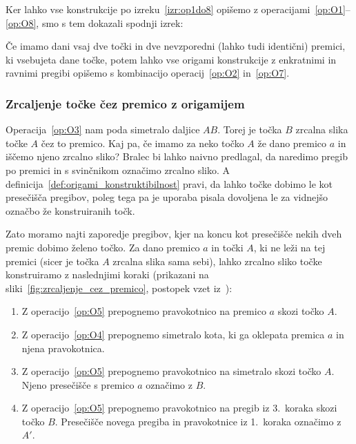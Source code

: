 Ker lahko vse konstrukcije po izreku~\ref{izr:op1do8} opišemo z operacijami~\ref{op:O1}--\ref{op:O8}, smo s tem dokazali spodnji izrek:

\begin{izrek}
    \label{izr:dve_operaciji}
    Če imamo dani vsaj dve točki in dve nevzporedni (lahko tudi identični) premici, ki vsebujeta dane točke, potem lahko vse origami konstrukcije z enkratnimi in ravnimi pregibi opišemo s kombinacijo operacij~\ref{op:O2} in~\ref{op:O7}.
\end{izrek}

\subsubsection{Zrcaljenje točke čez premico z origamijem}
\label{zrcaljenje_origami}

Operacija~\ref{op:O3} nam poda simetralo daljice $AB$. Torej je točka $B$ zrcalna slika točke $A$ čez to premico. Kaj pa, če imamo za neko točko $A$ že dano premico $a$ in iščemo njeno zrcalno sliko? Bralec bi lahko naivno predlagal, da naredimo pregib po premici in s svinčnikom označimo zrcalno sliko. A definicija~\ref{def:origami_konstruktibilnost} pravi, da lahko točke dobimo le kot presečišča pregibov, poleg tega pa je uporaba pisala dovoljena le za vidnejšo označbo že konstruiranih točk.

Zato moramo najti zaporedje pregibov, kjer na koncu kot presečišče nekih dveh premic dobimo želeno točko. Za dano premico $a$ in točki $A$, ki ne leži na tej premici (sicer je točka $A$ zrcalna slika sama sebi), lahko zrcalno sliko točke konstruiramo z naslednjimi koraki (prikazani na sliki~\ref{fig:zrcaljenje_cez_premico}, postopek vzet iz~\cite[str.\ 28]{hull2020}):
\begin{enumerate}
    \item Z operacijo~\ref{op:O5} prepognemo pravokotnico na premico $a$ skozi točko $A$.
    \item Z operacijo~\ref{op:O4} prepognemo simetralo kota, ki ga oklepata premica $a$ in njena pravokotnica.
    \item Z operacijo~\ref{op:O5} prepognemo pravokotnico na simetralo skozi točko $A$. Njeno presečišče s premico $a$ označimo z $B$.
    \item Z operacijo~\ref{op:O5} prepognemo pravokotnico na pregib iz 3.\ koraka skozi točko $B$. Presečišče novega pregiba in pravokotnice iz 1.\ koraka označimo z $A'$.
\end{enumerate}

